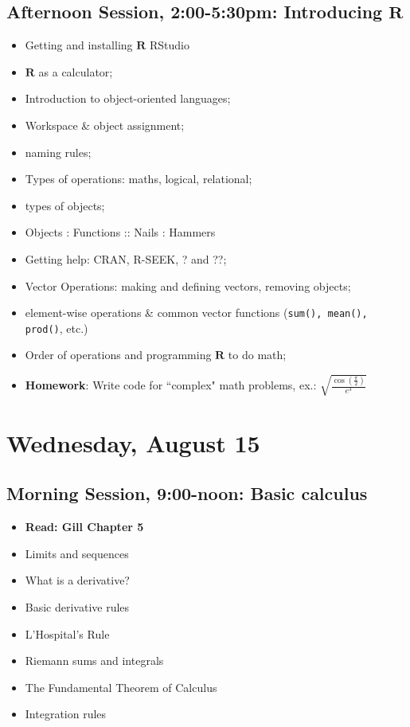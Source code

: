 \documentclass[12pt,a4paper]{article}
\begin{document}
\subsection*{Afternoon Session, 2:00-5:30pm: Introducing $\mathbf{R}$}
\begin{itemize}
\setlength{\itemsep}{0pt}
\footnotesize
\item Getting and installing $\mathbf{R}$ RStudio
\item $\mathbf{R}$ as a calculator;
\item Introduction to object-oriented languages;
\item Workspace \& object assignment;
\item naming rules;
\item Types of operations: maths, logical, relational;
\item types of objects;
\item Objects : Functions :: Nails : Hammers
\item Getting help: CRAN, R-SEEK, ? and ??;
\item Vector Operations: making and defining vectors, removing objects;
\item element-wise operations \& common vector functions (\texttt{sum(), mean(), prod()}, etc.)
\item Order of operations and programming $\mathbf{R}$ to do math;
\item \textbf{Homework}: Write code for ``complex" math problems, ex.: $\sqrt{\frac{\cos(\frac{\pi}{2})}{e^{3}}}$
\end{itemize}


\section*{Wednesday, August 15}
\subsection*{Morning Session, 9:00-noon: Basic calculus}
\begin{itemize}
\setlength{\itemsep}{0pt}
\footnotesize
\item \textbf{Read: Gill Chapter 5}
\item Limits and sequences
\item What is a derivative?
\item Basic derivative rules
\item L'Hospital's Rule
\item Riemann sums and integrals
\item The Fundamental Theorem of Calculus
\item Integration rules

\end{itemize}
\end{document}
